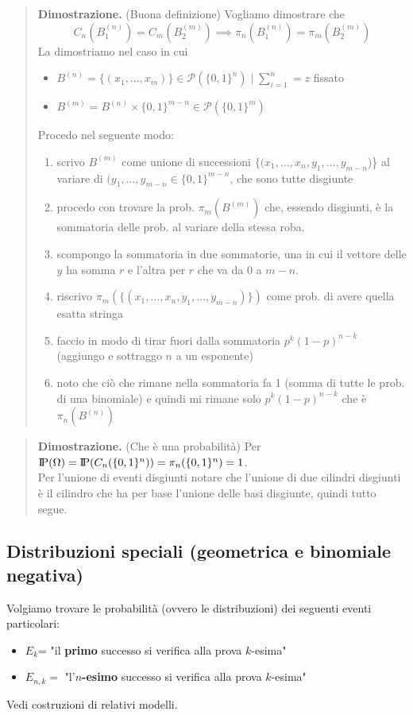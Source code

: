 \documentclass[a4paper,10pt]{article}
\newcommand{\pr}{\text{I\kern-0.15em P}} %
\theoremstyle{remark}
\theoremstyle{definition}
\newenvironment{dimo}{\begin{quote}\textbf{Dimostrazione.}}{\end{quote}} %
\begin{document}
\begin{dimo}
    (Buona definizione) Vogliamo dimostrare che $$C_n(B_1^{(n)}) = C_m(B_2^{(m)}) \implies \pi_n(B_1^{(n)})=\pi_m(B_2^{(m)})$$
    La dimostriamo nel caso in cui
    \begin{itemize}
    \item $B^{(n)} =\{(x_1,\dots ,x_m)\} \in \mathscr{P}(\{0,1\}^n) \mid \sum_{i=1}^n=z$ fissato 
    \item $B^{(m)} = B^{(n)} \times \{0,1\}^{m-n} \in \mathscr{P}(\{0,1\}^{m})$
\end{itemize}
Procedo nel seguente modo:
\begin{enumerate}
    \item scrivo $B^{(m)}$ come unione di successioni $\{(x_1,\dots , x_n,y_1, \dots, y_{m-n}$)\} al variare di $(y_1,\dots , y_{m-n} \in \{0,1\}^{m-n}$, che sono tutte disgiunte
    \item procedo con trovare la prob. $\pi_m(B^{(m)})$ che, essendo disgiunti, è la sommatoria delle prob. al variare della stessa roba.
    \item scompongo la sommatoria in due sommatorie, una in cui il vettore delle $y$ ha somma $r$ e l'altra per $r$ che va da 0 a $m-n$.
    \item riscrivo $\pi_m(\{(x_1,\dots , x_n,y_1, \dots, y_{m-n})\})$ come prob. di avere quella esatta stringa
    \item faccio in modo di tirar fuori dalla sommatoria $p^k(1-p)^{n-k}$ (aggiungo e sottraggo $n$ a un esponente)
    \item noto che ciò che rimane nella sommatoria fa 1 (somma di tutte le prob. di una binomiale) e quindi mi rimane solo  $p^k(1-p)^{n-k}$ che è $\pi_n(B^{(n)})$
\end{enumerate}
\end{dimo}

\begin{dimo}
    (Che è una probabilità) Per $\pr(\Omega)=\pr(C_n(\{0,1\}^n))=\pi_n(\{0,1\}^n)=1$.\\
    Per l'unione di eventi disgiunti notare che l'unione di due cilindri disgiunti è il cilindro che ha per base l'unione delle basi disgiunte, quindi tutto segue.
\end{dimo}

\subsection*{Distribuzioni speciali (geometrica e binomiale negativa)}
Volgiamo trovare le probabilità (ovvero le distribuzioni) dei seguenti eventi particolari:
\begin{itemize}
    \item $E_k$= "il \textbf{primo} successo si verifica alla prova $k$-esima"
    \item $E_{n,k}=$ "l'\textbf{$n$-esimo} successo si verifica alla prova $k$-esima"
\end{itemize}
Vedi costruzioni di relativi modelli.
\end{document}
